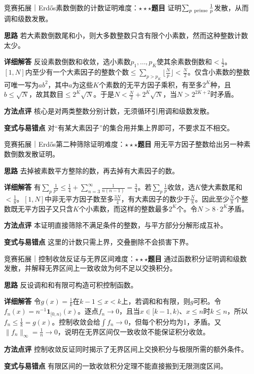 \begin{example}{竞赛拓展｜Erdős素数倒数的计数证明}{难度：$\star\star\star$}\label{deep:ex:series_source_deep:prime}\textbf{题目} 证明$\sum_{p\ {\rm prime}}\frac{1}{p}$发散，从而调和级数发散。\par\textbf{思路} 若大素数倒数尾和小，则大多数整数只含有限个小素数，然而这种整数计数太少。\par\textbf{详细解答} 反设素数倒数和收敛，选小素数$p_1,\ldots,p_K$使其余素数倒数和$<\frac{1}{2}$。$[1,N]$内至少有一个大素因子的整数个数$\le\sum_{p>p_K}\lfloor \frac{N}{p}\rfloor<\frac{N}{2}$。仅含小素数的整数可唯一写为$ab^2$，其中$a$为这些$K$个素数的无平方因子乘积，有至多$2^K$种，且$b\le\sqrt N$，故其数目$\le2^K\sqrt N$。于是$N<\frac{N}{2}+2^K\sqrt N$，当$N>2^{2K+2}$时矛盾。\par\textbf{方法点评} 核心是对两类整数分别计数，无须循环引用调和级数发散。\par\textbf{变式与易错点} 对“有某大素因子”的集合用并集上界即可，不要求互不相交。\end{example}

\begin{example}{竞赛拓展｜Erdős第二种筛除证明}{难度：$\star\star\star$}\label{deep:ex:series_source_deep:primesecond}\textbf{题目} 用无平方因子整数给出另一种素数倒数发散证明。\par\textbf{思路} 去掉被素数平方整除的数，再去掉有大素因子的数。\par\textbf{详细解答} 有$\sum_p\frac{1}{p^2}\le\frac{1}{4}+\sum_{n=3}^\infty\frac{1}{n(n-1)}=\frac{3}{4}$。若$\sum_p\frac{1}{p}$收敛，选$K$使大素数尾和$<\frac{1}{8}$。$[1,N]$中非无平方因子数至多$\frac{3N}{4}$，有大素因子的数少于$\frac{N}{8}$。因此至少$\frac{N}{8}$个整数既无平方因子又只含$K$个小素数，而这样的整数最多$2^K$个。令$N>8\cdot2^K$矛盾。\par\textbf{方法点评} 本证明直接筛除不满足条件的整数，与平方部分分解形成互补。\par\textbf{变式与易错点} 这里的计数只需上界，交叠删除不会损害下界。\end{example}

\begin{example}{竞赛拓展｜控制收敛反证与无界区间}{难度：$\star\star\star$}\label{deep:ex:series_source_deep:dominated}\textbf{题目} 通过函数积分证明调和级数发散，并解释无界区间上一致收敛为何不足以交换积分。\par\textbf{思路} 反设调和和有限可构造可积控制函数。\par\textbf{详细解答} 令$g(x)=\frac{1}{k}$在$k-1\le x<k$上，若调和和有限，则$g$可积。令$f_n(x)=n^{-1}\mathbf1_{[0,n)}(x)$。逐点$f_n\to0$，且当$x\in[k-1,k)$、$x\le n$时$k\le n$，所以$f_n\le\frac{1}{k}=g(x)$。控制收敛会给$\int f_n\to0$，但每个积分均为1，矛盾。又$\|f_n\|_\infty=\frac{1}{n}\to0$，说明在无界区间仅一致收敛不能保证积分收敛。\par\textbf{方法点评} 控制收敛反证同时揭示了无界区间上交换积分与极限所需的额外条件。\par\textbf{变式与易错点} 有限区间的一致收敛积分定理不能直接搬到无限测度区间。\end{example}

